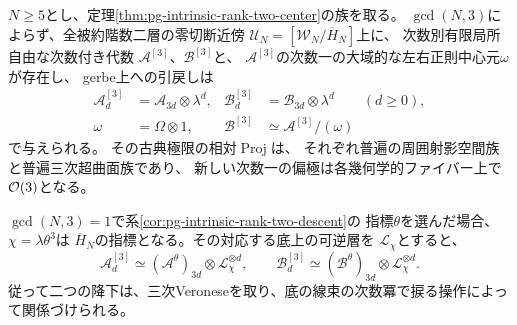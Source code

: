 \begin{corollary}[全次元での三次Veroneseの降下]
\label{cor:pg-intrinsic-third-veronese-descent}
$N\ge5$とし、定理\ref{thm:pg-intrinsic-rank-two-center}の族を取る。
$\gcd(N,3)$によらず、全被約階数二層の零切断近傍
$\mathcal U_N=[\mathcal W_N/\overline H_N]$上に、
次数別有限局所自由な次数付き代数
$\mathcal A^{[3]}$、$\mathcal B^{[3]}$と、
$\mathcal A^{[3]}$の次数一の大域的な左右正則中心元$\omega$が存在し、
gerbe上への引戻しは
\begin{equation}
 \begin{aligned}
 \mathcal A^{[3]}_d&=\mathcal A_{3d}\otimes\lambda^d,&
 \mathcal B^{[3]}_d&=\mathcal B_{3d}\otimes\lambda^d
 \qquad(d\ge0),\\
 \omega&=\Omega\otimes1,&
 \mathcal B^{[3]}&\simeq\mathcal A^{[3]}/(\omega)
 \end{aligned}
 \label{eq:pg-intrinsic-third-veronese}
\end{equation}
で与えられる。
その古典極限の相対$\operatorname{Proj}$は、
それぞれ普遍の周囲射影空間族と普遍三次超曲面族であり、
新しい次数一の偏極は各幾何学的ファイバー上で$\mathcal O(3)$となる。

$\gcd(N,3)=1$で系\ref{cor:pg-intrinsic-rank-two-descent}の
指標$\theta$を選んだ場合、$\chi=\lambda\theta^3$は
$\overline H_N$の指標となる。その対応する底上の可逆層を
$\mathcal L_\chi$とすると、
\begin{equation}
 \mathcal A^{[3]}_d
   \simeq(\mathcal A^\theta)_{3d}\otimes\mathcal L_\chi^{\otimes d},
 \qquad
 \mathcal B^{[3]}_d
   \simeq(\mathcal B^\theta)_{3d}\otimes\mathcal L_\chi^{\otimes d}.
 \label{eq:pg-intrinsic-veronese-character-comparison}
\end{equation}
従って二つの降下は、三次Veroneseを取り、底の線束の次数冪で捩る操作によって関係づけられる。
\end{corollary}
